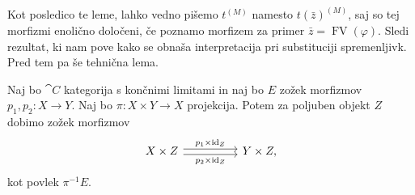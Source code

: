\documentclass[../kategoricna_logika.tex]{subfiles}
\begin{document}
  Kot posledico te leme, lahko vedno pišemo $t^{(M)}$ namesto
  $t(\bar{z})^{(M)}$, saj so tej morfizmi enolično določeni, če
  poznamo morfizem za primer $\bar{z} = \operatorname{FV}(\varphi)$.
  Sledi rezultat, ki nam pove kako se obnaša interpretacija pri
  substituciji spremenljivk. Pred tem pa še tehnična lema.
  \begin{lema}\label{lema:zožek-dodatnega-faktorja}
    Naj bo $\cat{C}$ kategorija s končnimi limitami in naj bo $E$
    zožek morfizmov $p_1, p_2 : X \to Y$. Naj bo
    $\pi : X \times Y \to X$ projekcija. Potem za poljuben objekt $Z$
    dobimo zožek morfizmov
    \begin{equation*}
      \begin{tikzcd}[column sep=huge]
        X \times Z \ar[r, shift left, "p_1 \times \mathrm{id}_Z"]
        \ar[r, shift right, "p_2 \times \mathrm{id}_Z"'] & Y \times Z,
      \end{tikzcd}
    \end{equation*}
    kot povlek $\pi^{-1}E$.
  \end{lema}
\end{document}
